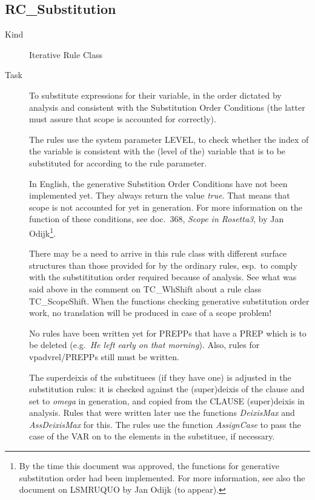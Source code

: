 \subsection{RC\_Substitution}
\begin{description}
\item[Kind] Iterative Rule Class
\item[Task] To substitute expressions for their variable, in the order dictated 
by analysis and consistent with the Substitution Order Conditions (the latter 
must assure that scope is accounted for correctly).

The rules use the system parameter LEVEL, to check whether the index of the 
variable is consistent with the (level of the) variable that is to be 
substituted for according to the rule parameter.

In English, the generative Substition Order Conditions have not been 
implemented yet. They always return the value {\em true\/}. That means that 
scope is not accounted for yet in generation. For more information on the 
function of these conditions, see doc.\ 368, {\em Scope in Rosetta3\/}, by Jan 
Odijk\footnote{By the time this document was approved, the functions for 
generative substitution order had been implemented. For more information, see 
also the document on LSMRUQUO by Jan Odijk (to appear).}.

There may be a need to arrive in this rule class with different surface 
structures than those provided for by the ordinary rules, esp.\
to comply with the substititution order required because of analysis. 
See what was said above in the comment on TC\_WhShift about a rule class 
TC\_ScopeShift. When the functions checking generative substitution order 
work, no translation will be produced in case of a scope problem!

No rules have been written yet for PREPPs that have a PREP which is to be 
deleted (e.g.\ {\em He left early {\em on} that morning\/}). Also, rules for 
vpadvrel/PREPPs still must be written.

The superdeixis of the substituees (if they have one) is adjusted in the 
substitution rules:
it is checked against the (super)deixis of the clause and set to {\em omega\/} 
in generation, and copied from the CLAUSE 
(super)deixis in analysis. Rules that were written later use the functions {\em 
DeixisMax\/} and {\em AssDeixisMax\/} for this. 
The rules use the function {\em AssignCase\/} to 
pass the case of the VAR on to the elements in the substituee, if necessary.


\end{description}
